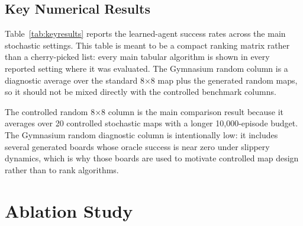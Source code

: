 \documentclass[10pt]{article}
\begin{document}
\subsection{Key Numerical Results}
Table~\ref{tab:keyresults} reports the learned-agent success rates across the main stochastic settings. This table is meant to be a compact ranking matrix rather than a cherry-picked list: every main tabular algorithm is shown in every reported setting where it was evaluated. The Gymnasium random column is a diagnostic average over the standard 8$\times$8 map plus the generated random maps, so it should not be mixed directly with the controlled benchmark columns.

\begin{table}[!htbp]
\centering
\caption{Mean final greedy evaluation success across stochastic settings. Higher is better.}
\label{tab:keyresults}
\end{table}

The controlled random 8$\times$8 column is the main comparison result because it averages over 20 controlled stochastic maps with a longer 10,000-episode budget. The Gymnasium random diagnostic column is intentionally low: it includes several generated boards whose oracle success is near zero under slippery dynamics, which is why those boards are used to motivate controlled map design rather than to rank algorithms.

\section{Ablation Study}
\end{document}
